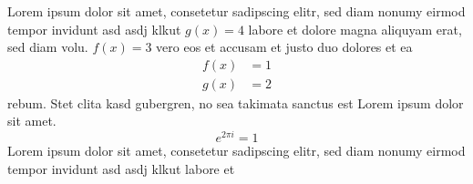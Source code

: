 Lorem ipsum dolor sit amet, consetetur sadipscing elitr, sed
diam nonumy eirmod tempor invidunt  asd asdj klkut \( g(x)
= 4\) labore et dolore magna aliquyam erat, sed diam volu.
$f(x) = 3$ vero eos et accusam et justo duo dolores et ea
\begin{align}
  f(x) &= 1 \\
  g(x) &= 2
\end{align}
rebum. Stet clita kasd gubergren, no sea takimata sanctus
est Lorem ipsum dolor sit amet.
\[
  e^{2\pi i} = 1
\]
Lorem ipsum dolor sit amet, consetetur sadipscing elitr, sed
diam nonumy eirmod tempor invidunt  asd asdj klkut labore et
